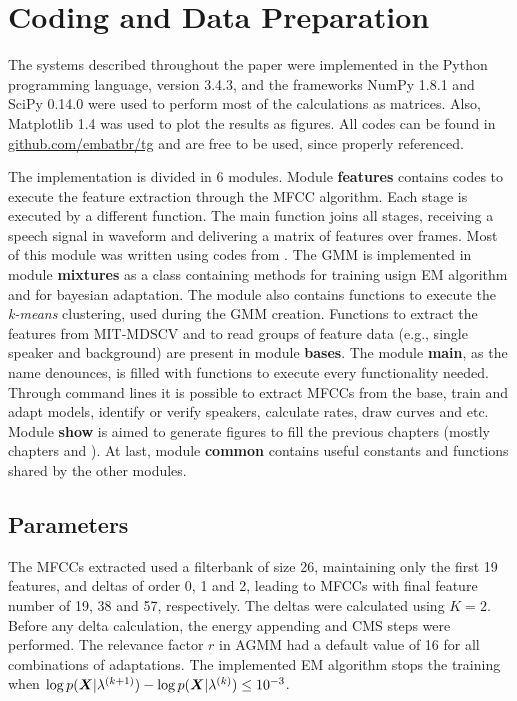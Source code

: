 \section{Coding and Data Preparation}
\label{sec:coding-and-data-preparation}

The systems described throughout the paper were implemented in the Python programming language, version 3.4.3, and the frameworks NumPy 1.8.1 and SciPy 0.14.0 were used to perform most of the calculations as matrices. Also, Matplotlib 1.4 was used to plot the results as figures. All codes can be found in \url{github.com/embatbr/tg} and are free to be used, since properly referenced.

The implementation is divided in 6 modules. Module \textbf{features} contains codes to execute the feature extraction through the MFCC algorithm. Each stage is executed by a different function. The main function joins all stages, receiving a speech signal in waveform and delivering a matrix of features over frames. Most of this module was written using codes from . The GMM is implemented in module \textbf{mixtures} as a class containing methods for training usign EM algorithm and for bayesian adaptation. The module also contains functions to execute the \emph{k-means} clustering, used during the GMM creation. Functions to extract the features from MIT-MDSCV and to read groups of feature data (e.g., single speaker and background) are present in module \textbf{bases}. The module \textbf{main}, as the name denounces, is filled with functions to execute every functionality needed. Through command lines it is possible to extract MFCCs from the base, train and adapt models, identify or verify speakers, calculate rates, draw curves and etc. Module \textbf{show} is aimed to generate figures to fill the previous chapters (mostly chapters  and ). At last, module \textbf{common} contains useful constants and functions shared by the other modules.

\subsection{Parameters}

The MFCCs extracted used a filterbank of size 26, maintaining only the first 19 features, and deltas of order 0, 1 and 2, leading to MFCCs with final feature number of 19, 38 and 57, respectively. The deltas were calculated using $K = 2$. Before any delta calculation, the energy appending and CMS steps were performed. The relevance factor $r$ in AGMM had a default value of 16 for all combinations of adaptations. The implemented EM algorithm stops the training when $\log p(\boldsymbol{X}|\lambda^{(k+1)}) - \log p(\boldsymbol{X}|\lambda^{(k)}) \le 10^{-3}$.

